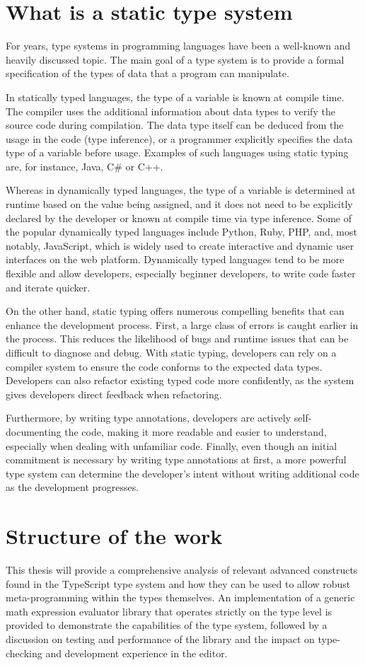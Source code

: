 \section{What is a static type system}

For years, type systems in programming languages have been a well-known and heavily discussed topic. The main goal of a type system is to provide a formal specification of the types of data that a program can manipulate.

In statically typed languages, the type of a variable is known at compile time. The compiler uses the additional information about data types to verify the source code during compilation. The data type itself can be deduced from the usage in the code (type inference), or a programmer explicitly specifies the data type of a variable before usage. Examples of such languages using static typing are, for instance, Java, C\# or C++.

Whereas in dynamically typed languages, the type of a variable is determined at runtime based on the value being assigned, and it does not need to be explicitly declared by the developer or known at compile time via type inference. Some of the popular dynamically typed languages include Python, Ruby, PHP, and, most notably, JavaScript, which is widely used to create interactive and dynamic user interfaces on the web platform. Dynamically typed languages tend to be more flexible and allow developers, especially beginner developers, to write code faster and iterate quicker.

On the other hand, static typing offers numerous compelling benefits that can enhance the development process. First, a large class of errors is caught earlier in the process. This reduces the likelihood of bugs and runtime issues that can be difficult to diagnose and debug. With static typing, developers can rely on a compiler system to ensure the code conforms to the expected data types. Developers can also refactor existing typed code more confidently, as the system gives developers direct feedback when refactoring.

Furthermore, by writing type annotations, developers are actively self-documenting the code, making it more readable and easier to understand, especially when dealing with unfamiliar code. Finally, even though an initial commitment is necessary by writing type annotations at first, a more powerful type system can determine the developer's intent without writing additional code as the development progresses.

\section{Structure of the work}

This thesis will provide a comprehensive analysis of relevant advanced constructs found in the TypeScript type system and how they can be used to allow robust meta-programming within the types themselves. An implementation of a generic math expression evaluator library that operates strictly on the type level is provided to demonstrate the capabilities of the type system, followed by a discussion on testing and performance of the library and the impact on type-checking and development experience in the editor.
